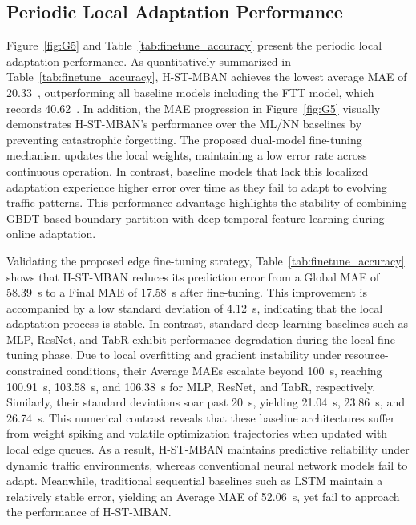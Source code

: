 \documentclass[journal]{IEEEtran}
\begin{document}
\subsection{Periodic Local Adaptation Performance}
Figure~\ref{fig:G5} and Table~\ref{tab:finetune_accuracy} present the periodic local adaptation performance. As quantitatively summarized in Table~\ref{tab:finetune_accuracy}, H-ST-MBAN achieves the lowest average MAE of 20.33~, outperforming all baseline models including the FTT model, which records 40.62~. In addition, the MAE progression in Figure~\ref{fig:G5} visually demonstrates H-ST-MBAN's performance over the ML/NN baselines by preventing catastrophic forgetting. The proposed dual-model fine-tuning mechanism updates the local weights, maintaining a low error rate across continuous operation. In contrast, baseline models that lack this localized adaptation experience higher error over time as they fail to adapt to evolving traffic patterns. This performance advantage highlights the stability of combining GBDT-based boundary partition with deep temporal feature learning during online adaptation.

Validating the proposed edge fine-tuning strategy, Table~\ref{tab:finetune_accuracy} shows that H-ST-MBAN reduces its prediction error from a Global MAE of 58.39~s to a Final MAE of 17.58~s after fine-tuning. This improvement is accompanied by a low standard deviation of 4.12~s, indicating that the local adaptation process is stable. In contrast, standard deep learning baselines such as MLP, ResNet, and TabR exhibit performance degradation during the local fine-tuning phase. Due to local overfitting and gradient instability under resource-constrained conditions, their Average MAEs escalate beyond 100~s, reaching 100.91~s, 103.58~s, and 106.38~s for MLP, ResNet, and TabR, respectively. Similarly, their standard deviations soar past 20~s, yielding 21.04~s, 23.86~s, and 26.74~s. This numerical contrast reveals that these baseline architectures suffer from weight spiking and volatile optimization trajectories when updated with local edge queues. As a result, H-ST-MBAN maintains predictive reliability under dynamic traffic environments, whereas conventional neural network models fail to adapt. Meanwhile, traditional sequential baselines such as LSTM maintain a relatively stable error, yielding an Average MAE of 52.06~s, yet fail to approach the performance of H-ST-MBAN.
\end{document}
